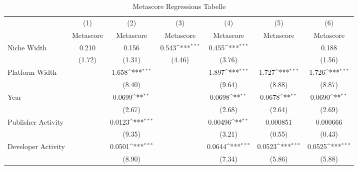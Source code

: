 \documentclass{article}
\begin{document}
\begin{table}[htbp]\centering
\def\sym#1{\ifmmode^{#1}\else\(^{#1}\)\fi}
\caption*{Metascore Regressions Tabelle}
\begin{tabular}{l*{6}{c}}
\hline\hline
                    &\multicolumn{1}{c}{(1)}&\multicolumn{1}{c}{(2)}&\multicolumn{1}{c}{(3)}&\multicolumn{1}{c}{(4)}&\multicolumn{1}{c}{(5)}&\multicolumn{1}{c}{(6)}\\
                    &\multicolumn{1}{c}{Metascore}&\multicolumn{1}{c}{Metascore}&\multicolumn{1}{c}{Metascore}&\multicolumn{1}{c}{Metascore}&\multicolumn{1}{c}{Metascore}&\multicolumn{1}{c}{Metascore}\\
\hline
Niche Width         &       0.210         &       0.156         &       0.543\sym{***}&       0.455\sym{***}&                     &       0.188         \\
                    &      (1.72)         &      (1.31)         &      (4.46)         &      (3.76)         &                     &      (1.56)         \\
[1em]
Platform Width      &                     &       1.658\sym{***}&                     &       1.897\sym{***}&       1.727\sym{***}&       1.726\sym{***}\\
                    &                     &      (8.40)         &                     &      (9.64)         &      (8.88)         &      (8.87)         \\
[1em]
Year                &                     &      0.0699\sym{**} &                     &      0.0698\sym{**} &      0.0678\sym{**} &      0.0690\sym{**} \\
                    &                     &      (2.67)         &                     &      (2.68)         &      (2.64)         &      (2.69)         \\
[1em]
Publisher Activity  &                     &      0.0123\sym{***}&                     &     0.00496\sym{**} &    0.000851         &    0.000666         \\
                    &                     &      (9.35)         &                     &      (3.21)         &      (0.55)         &      (0.43)         \\
[1em]
Developer Activity  &                     &      0.0501\sym{***}&                     &      0.0644\sym{***}&      0.0523\sym{***}&      0.0525\sym{***}\\
                    &                     &      (8.90)         &                     &      (7.34)         &      (5.86)         &      (5.88)         \\

\end{tabular}
\end{table}
\end{document}
